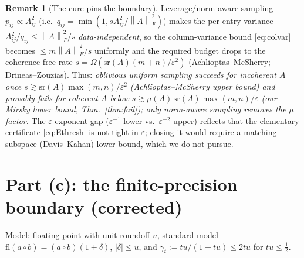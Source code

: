 \documentclass{amsart}
\theoremstyle{definition}
\newtheorem{remark}{Remark}
\newcommand{\Frob}[1]{\left\lVert #1\right\rVert_F}
\begin{document}
\begin{remark}[The cure pins the boundary]\label{rem:cure}
Leverage/norm-aware sampling $p_{ij}\propto A_{ij}^2$ (i.e.\
$q_{ij}=\min(1,s A_{ij}^2/\Frob A^2)$) makes the per-entry variance
$A_{ij}^2/q_{ij}\le\Frob A^2/s$ \emph{data-independent}, so the column-variance
bound \eqref{eq:colvar} becomes $\le m\Frob A^2/s$ uniformly and the required
budget drops to the coherence-free rate
$s=\Omega(\mathrm{sr}(A)(m+n)/\varepsilon^2)$ (Achlioptas--McSherry;
Drineas--Zouzias). Thus: \emph{oblivious uniform sampling succeeds for
incoherent $A$ once $s\gtrsim\mathrm{sr}(A)\max(m,n)/\varepsilon^2$
(Achlioptas--McSherry upper bound) and provably fails for coherent $A$ below
$s\gtrsim\mu(A)\,\mathrm{sr}(A)\max(m,n)/\varepsilon$ (our Mirsky lower
bound, Thm.~\ref{thm:fail}); only norm-aware sampling removes the $\mu$
factor.} The $\varepsilon$-exponent gap ($\varepsilon^{-1}$ lower vs.\
$\varepsilon^{-2}$ upper) reflects that the elementary certificate
\eqref{eq:Ethresh} is not tight in $\varepsilon$; closing it would require a
matching subspace (Davis--Kahan) lower bound, which we do not pursue.
\end{remark}

\section{Part (c): the finite-precision boundary (corrected)}

Model: floating point with unit roundoff $u$, standard model
$\mathrm{fl}(a\circ b)=(a\circ b)(1+\delta)$, $|\delta|\le u$, and
$\gamma_t:=tu/(1-tu)\le2tu$ for $tu\le\tfrac12$.
\end{document}
